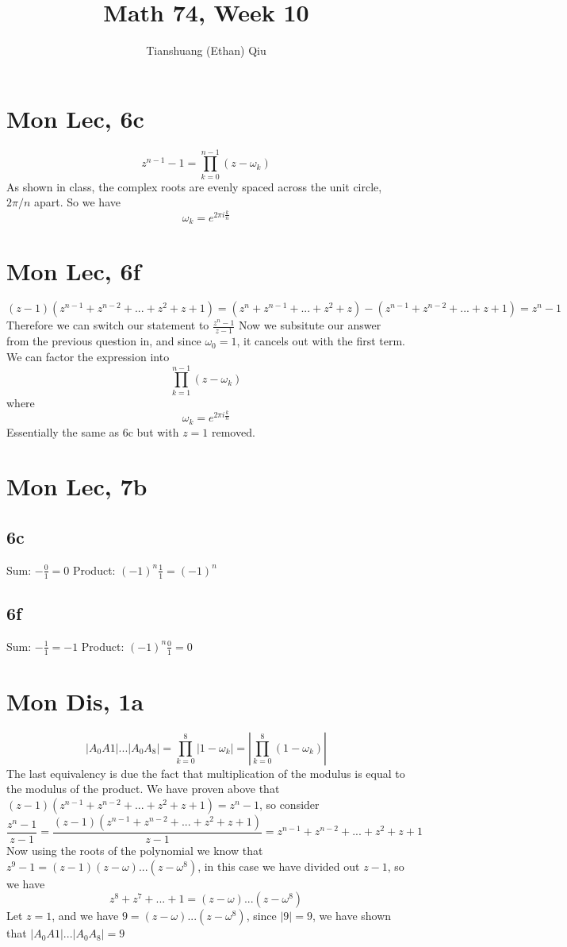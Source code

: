 \documentclass[12pt]{article}
\author{Tianshuang (Ethan) Qiu}
\begin{document}
\title{Math 74, Week 10}
\maketitle

\section{Mon Lec, 6c}
$$z^{n-1}-1 = \prod_{k=0}^{n-1}(z-\omega_k)$$
As shown in class, the complex roots are evenly spaced across the unit circle, $2\pi/n$ apart. So we have
$$\omega_k = e^{2\pi i \frac{k}{n}}$$


\section{Mon Lec, 6f}
$$(z-1)(z^{n-1}+z^{n-2}+...+z^{2}+z+1) = (z^n+z^{n-1}+...+z^2+z)-(z^{n-1}+z^{n-2}+...+z+1)=z^n-1$$
Therefore we can switch our statement to $\frac{z^n-1}{z-1}$
\newline
Now we subsitute our answer from the previous question in, and since $\omega_0=1$, it cancels out with the first term.
\newline
We can factor the expression into
$$\prod_{k=1}^{n-1}(z-\omega_k)$$
where
$$\omega_k = e^{2\pi i \frac{k}{n}}$$
Essentially the same as 6c but with $z=1$ removed.


\section{Mon Lec, 7b}

\subsection{6c}
Sum: $-\frac{0}{1}=0$
\newline
Product: $(-1)^n\frac{1}{1} = (-1)^n$

\subsection{6f}
Sum: $-\frac{1}{1}=-1$
\newline
Product: $(-1)^n\frac{0}{1} = 0$
\newpage


\section{Mon Dis, 1a}
$$|A_0A1|...|A_0A_8|=\prod_{k=0}^{8}|1-\omega_k|=|\prod_{k=0}^{8}(1-\omega_k)|$$
The last equivalency is due the fact that multiplication of the modulus is equal to the modulus of the product.
\newline
We have proven above that $(z-1)(z^{n-1}+z^{n-2}+...+z^{2}+z+1)=z^n-1$, so consider
$$\frac{z^n-1}{z-1}=\frac{(z-1)(z^{n-1}+z^{n-2}+...+z^{2}+z+1)}{z-1}=z^{n-1}+z^{n-2}+...+z^{2}+z+1$$
Now using the roots of the polynomial we know that $z^9-1=(z-1)(z-\omega)...(z-\omega^8)$, in this case we have divided out $z-1$, so we have
$$z^8+z^7+...+1=(z-\omega)...(z-\omega^8)$$
Let $z=1$, and we have $9=(z-\omega)...(z-\omega^8)$, since $|9|=9$, we have shown that $|A_0A1|...|A_0A_8|=9$
\end{document}
